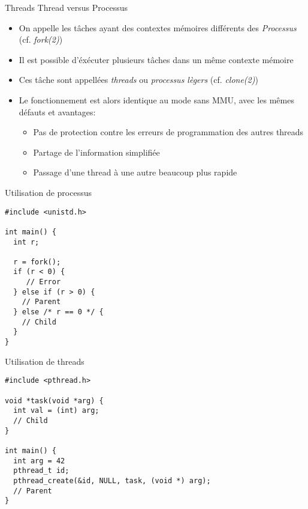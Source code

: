 \begin{frame}{Threads}
  Thread versus Processus
  \begin{itemize}
  \item On  appelle les tâches  ayant des contextes  mémoires différents
    des \emph{Processus} (cf. \emph{fork(2)})
  \item  Il est  possible  d'éxécuter plusieurs  tâches  dans un  même
    contexte mémoire
  \item  Ces  tâche sont  appellées  \emph{threads} ou  \emph{processus
      lègers} (cf. \emph{clone(2)})
  \item Le fonctionnement  est alors identique au mode  sans MMU, avec
    les mêmes défauts et avantages:
    \begin{itemize}
    \item  Pas  de protection  contre  les  erreurs de programmation  des
      autres threads
    \item Partage de l'information simplifiée
    \item Passage d'une thread à une autre beaucoup plus rapide
    \end{itemize}
  \end{itemize}
\end{frame} 

\begin{frame}[fragile]{Utilisation de processus}
\begin{lstlisting}
#include <unistd.h>

int main() {
  int r;

  r = fork();
  if (r < 0) {
     // Error
  } else if (r > 0) {
    // Parent
  } else /* r == 0 */ {
    // Child
  }
}
\end{lstlisting} 
\end{frame} 

\begin{frame}[fragile]{Utilisation de threads}
\begin{lstlisting}
#include <pthread.h>

void *task(void *arg) {
  int val = (int) arg;
  // Child
}

int main() {
  int arg = 42
  pthread_t id;
  pthread_create(&id, NULL, task, (void *) arg);
  // Parent
}
\end{lstlisting} 
\end{frame} 


